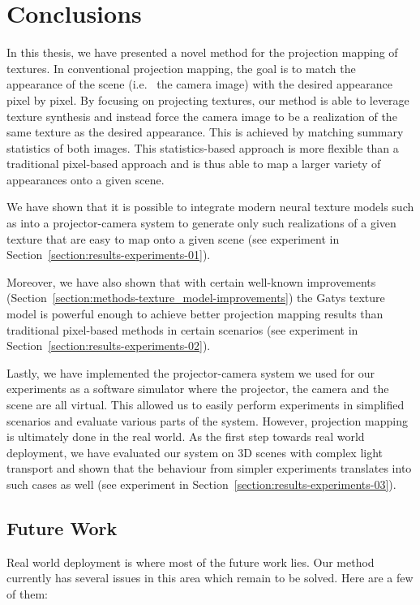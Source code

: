 \chapter{Conclusions}
\label{chapter:conclusions}

In this thesis, we have presented a novel method for the projection mapping of textures. In conventional projection mapping, the goal is to match the appearance of the scene (i.e.~ the camera image) with the desired appearance pixel by pixel. By focusing on projecting textures, our method is able to leverage texture synthesis and instead force the camera image to be a realization of the same texture as the desired appearance. This is achieved by matching summary statistics of both images. This statistics-based approach is more flexible than a traditional pixel-based approach and is thus able to map a larger variety of appearances onto a given scene.

We have shown that it is possible to integrate modern neural texture models such as \citet{Gatys2015} into a projector-camera system to generate only such realizations of a given texture that are easy to map onto a given scene (see experiment in Section~\ref{section:results-experiments-01}).

Moreover, we have also shown that with certain well-known improvements (Section~\ref{section:methods-texture_model-improvements}) the Gatys texture model is powerful enough to achieve better projection mapping results than traditional pixel-based methods in certain scenarios (see experiment in Section~\ref{section:results-experiments-02}).

Lastly, we have implemented the projector-camera system we used for our experiments as a software simulator where the projector, the camera and the scene are all virtual. This allowed us to easily perform experiments in simplified scenarios and evaluate various parts of the system. However, projection mapping is ultimately done in the real world. As the first step towards real world deployment, we have evaluated our system on 3D scenes with complex light transport and shown that the behaviour from simpler experiments translates into such cases as well (see experiment in Section~\ref{section:results-experiments-03}).

\section{Future Work}
\label{section:conclusions-future_work}

Real world deployment is where most of the future work lies. Our method currently has several issues in this area which remain to be solved. Here are a few of them:

